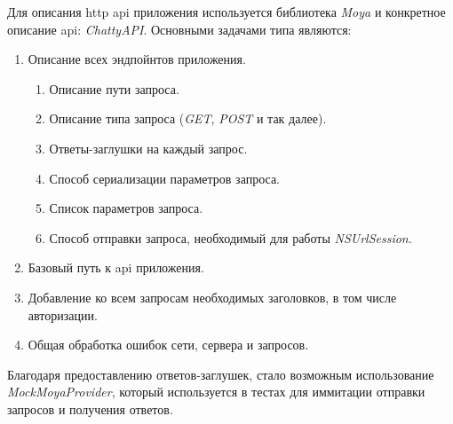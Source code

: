 Для описания \gls{http} \gls{api} приложения используется библиотека \textit{Moya} и конкретное описание \gls{api}: \textit{ChattyAPI}. Основными задачами типа являются:
\begin{enumerate}
	\item Описание всех эндпойнтов приложения.
	\begin{enumerate}
		\item Описание пути запроса.
		\item Описание типа запроса (\textit{GET}, \textit{POST} и так далее).
		\item Ответы-заглушки на каждый запрос.
		\item Способ сериализации параметров запроса.
		\item Список параметров запроса.
		\item Способ отправки запроса, необходимый для работы \textit{NSUrlSession}.
	\end{enumerate}
	\item Базовый путь к \gls{api} приложения.
	\item Добавление ко всем запросам необходимых заголовков, в том числе авторизации.
	\item Общая обработка ошибок сети, сервера и запросов.
\end{enumerate}

Благодаря предоставлению ответов-заглушек, стало возможным использование \textit{MockMoyaProvider}, который используется в тестах для иммитации отправки запросов и получения ответов.